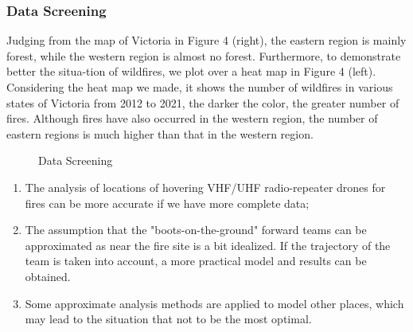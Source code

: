 \documentclass[12pt]{article}  %
\begin{document}
\subsubsection{Data Screening}
Judging from the map of Victoria in Figure 4 (right), the eastern region is mainly forest, while the western region is almost no forest. Furthermore, to demonstrate better the situa-tion of wildfires, we plot over a heat map in Figure 4 (left).
Considering the heat map we made, it shows the number of wildfires in various states of Victoria from 2012 to 2021, the darker the color, the greater number of fires. Although fires have also occurred in the western region, the number of eastern regions is much higher than that in the western region. 

\begin{figure}[htbp]
    \centering    
    \caption{Data Screening} %
\end{figure}

\begin{enumerate}[\bfseries 1.]
    \setlength{\parsep}{0ex} %
    \setlength{\topsep}{0ex} %
    \setlength{\itemsep}{0ex} %
    \item The analysis of locations of hovering VHF/UHF radio-repeater drones for fires can be more accurate if we have more complete data;
    \item The assumption that the "boots-on-the-ground" forward teams can be approximated as near the fire site is a bit idealized. If the trajectory of the team is taken into account, a more practical model and results can be obtained.
    \item Some approximate analysis methods are applied to model other places, which may lead to the situation that not to be the most optimal.
\end{enumerate}
\end{document}
